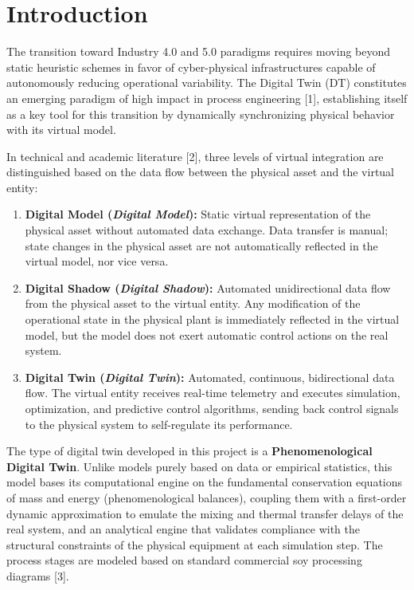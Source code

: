 \documentclass[10pt,letterpaper,twocolumn]{article}
\begin{document}
\section{Introduction}

The transition toward Industry 4.0 and 5.0 paradigms requires moving beyond static heuristic schemes in favor of cyber-physical infrastructures capable of autonomously reducing operational variability. The Digital Twin (DT) constitutes an emerging paradigm of high impact in process engineering [1], establishing itself as a key tool for this transition by dynamically synchronizing physical behavior with its virtual model.

In technical and academic literature [2], three levels of virtual integration are distinguished based on the data flow between the physical asset and the virtual entity:
\begin{enumerate}
    \item \textbf{Digital Model (\textit{Digital Model}):} Static virtual representation of the physical asset without automated data exchange. Data transfer is manual; state changes in the physical asset are not automatically reflected in the virtual model, nor vice versa.
    \item \textbf{Digital Shadow (\textit{Digital Shadow}):} Automated unidirectional data flow from the physical asset to the virtual entity. Any modification of the operational state in the physical plant is immediately reflected in the virtual model, but the model does not exert automatic control actions on the real system.
    \item \textbf{Digital Twin (\textit{Digital Twin}):} Automated, continuous, bidirectional data flow. The virtual entity receives real-time telemetry and executes simulation, optimization, and predictive control algorithms, sending back control signals to the physical system to self-regulate its performance.
\end{enumerate}

The type of digital twin developed in this project is a \textbf{Phenomenological Digital Twin}. Unlike models purely based on data or empirical statistics, this model bases its computational engine on the fundamental conservation equations of mass and energy (phenomenological balances), coupling them with a first-order dynamic approximation to emulate the mixing and thermal transfer delays of the real system, and an analytical engine that validates compliance with the structural constraints of the physical equipment at each simulation step. The process stages are modeled based on standard commercial soy processing diagrams [3].
\end{document}

